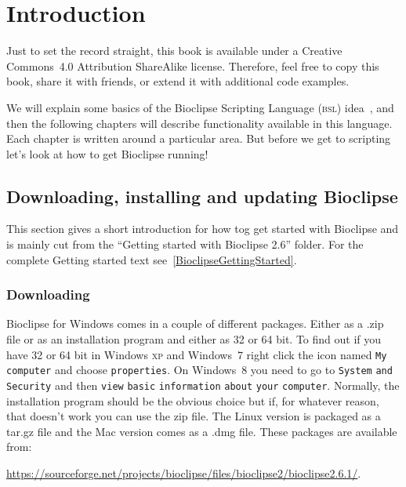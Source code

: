 \documentclass[a5paper, 10pt]{memoir}
\begin{document}
\chapter{Introduction}
\begin{refsection}

Just to set the record straight, this book is available under a Creative
Commons~4.0 Attribution ShareAlike license. Therefore, feel free to copy this
book, share it with friends, or extend it with additional code examples.

We will explain some basics of the Bioclipse Scripting Language (\textsc{bsl})
idea~\cite{spjuth2009bioclipse}, and then the following chapters will
describe functionality available in this language. Each chapter is
written around a particular area. But before we get to scripting let's look at
how to get Bioclipse running!

\section{Downloading, installing and updating Bioclipse}
This section gives a short introduction for how tog get started with Bioclipse
and is mainly cut from the ``Getting started with Bioclipse 2.6'' folder. For
the complete Getting started text see~\ref{BioclipseGettingStarted}.

\subsection{Downloading}
Bioclipse for Windows comes in a couple of different packages. Either as a .zip
file or as an installation program and either as 32 or 64 bit. To find out if
you have 32 or 64 bit in Windows \textsc{xp} and Windows~7 right click the icon
named \texttt{My} \texttt{computer} and choose \texttt{properties}. On
Windows~8 you need to go to \texttt{System} \texttt{and} \texttt{Security} and
then \texttt{view} \texttt{basic} \texttt{information} \texttt{about}
\texttt{your} \texttt{computer}.  Normally, the installation program should be
the obvious choice but if, for whatever reason, that doesn't work you can use
the zip file. The Linux version is packaged as a tar.gz file and the Mac
version comes as a .dmg file. These packages are available from:

\baselineskip
{\footnotesize \noindent \url{https://sourceforge.net/projects/bioclipse/files/bioclipse2/bioclipse2.6.1/}.}


\end{refsection}
\end{document}
